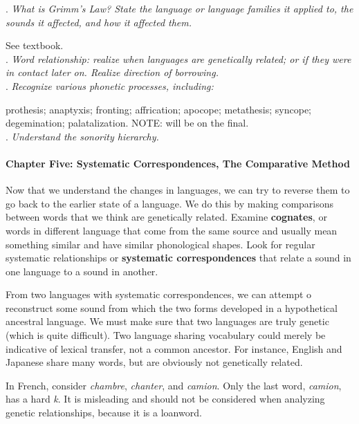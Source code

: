 \documentclass{exam}
\begin{document}
.\textit{ What is Grimm's Law? State the language or language families it applied to, the sounds it affected, and how it affected them.} 

\noindent See textbook.\\

. \textit{Word relationship: realize when languages are genetically related; or if they were in contact later on. Realize direction of borrowing.} \\

. \textit{Recognize various phonetic processes, including:  }

\noindent prothesis; anaptyxis; fronting; affrication; apocope; metathesis; syncope; degemination; palatalization. NOTE: will be on the final.\\

. \textit{Understand the sonority hierarchy.} 


\paragraph{Chapter Five: Systematic Correspondences, The Comparative Method}

\noindent Now that we understand the changes in languages, we can try to reverse them to go back to the earlier state of a language. We do this by making comparisons between words that we think are genetically related. Examine \textbf{cognates}, or words in different language that come from the same source and usually mean something similar and have similar phonological shapes. Look for regular systematic relationships or \textbf{systematic correspondences} that relate a sound in one language to a sound in another. 

From two languages with systematic correspondences, we can attempt o reconstruct some sound from which the two forms developed in a hypothetical ancestral language. We must make sure that two languages are truly genetic (which is quite difficult). Two language sharing vocabulary could merely be indicative of lexical transfer, not a common ancestor. For instance, English and Japanese share many words, but are obviously not genetically related. 

In French, consider \textit{chambre}, \textit{chanter}, and \textit{camion}. Only the last word, \textit{camion}, has a hard \textit{k}. It is misleading and should not be considered when analyzing genetic relationships, because it is a loanword. 
\end{document}
